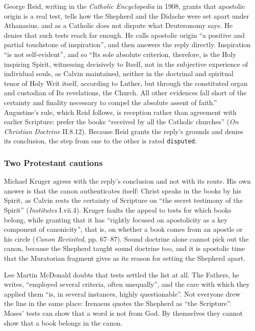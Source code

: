 \documentclass[11pt]{article}
\begin{document}
George Reid, writing in the \emph{Catholic Encyclopedia} in 1908, grants that apostolic origin is a real test, tells how the Shepherd and the Didache were set apart under Athanasius, and as a Catholic does not dispute what Deuteronomy says. He denies that such tests reach far enough. He calls apostolic origin “a positive and partial touchstone of inspiration”, and then answers the reply directly. Inspiration “is not self-evident”, and so “Its sole absolute criterion, therefore, is the Holy inspiring Spirit, witnessing decisively to Itself, not in the subjective experience of individual souls, as Calvin maintained, neither in the doctrinal and spiritual tenor of Holy Writ itself, according to Luther, but through the constituted organ and custodian of Its revelations, the Church. All other evidences fall short of the certainty and finality necessary to compel the absolute assent of faith.” Augustine’s rule, which Reid follows, is reception rather than agreement with earlier Scripture: prefer the books “received by all the Catholic churches” (\emph{On Christian Doctrine} II.8.12). Because Reid grants the reply’s grounds and denies its conclusion, the step from one to the other is rated \texttt{disputed}.

\subsubsection*{Two Protestant cautions}
Michael Kruger agrees with the reply’s conclusion and not with its route. His own answer is that the canon authenticates itself: Christ speaks in the books by his Spirit, as Calvin rests the certainty of Scripture on “the secret testimony of the Spirit” (\emph{Institutes} I.vii.4). Kruger faults the appeal to tests for which books belong, while granting that it has “rightly focused on apostolicity as a key component of canonicity”, that is, on whether a book comes from an apostle or his circle (\emph{Canon Revisited}, pp. 67–87). Sound doctrine alone cannot pick out the canon, because the Shepherd taught sound doctrine too, and it is apostolic time that the Muratorian fragment gives as its reason for setting the Shepherd apart.

Lee Martin McDonald doubts that tests settled the list at all. The Fathers, he writes, “employed several criteria, often unequally”, and the care with which they applied them “is, in several instances, highly questionable”. Not everyone drew the line in the same place: Irenaeus quotes the Shepherd as “the Scripture”. Moses’ tests can show that a word is not from God. By themselves they cannot show that a book belongs in the canon.
\end{document}
